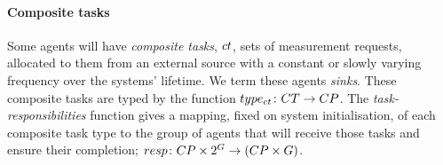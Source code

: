 \paragraph{Composite tasks}
\label{section:problem:composite_tasks}
\newcommand{\formalTaskResponsibilities}[2]{
	\functionFormal{resp}
	{\setCompositeTaskType{}{} \times \powerSetAgent{}{}{}{}}
	({\setCompositeTaskType{}{} \times \setAgent{}{}})
}
\newcommand{\functionTaskResponsibilities}[2]{
	\functionSignature{resp}
	{\varCompositeTaskType{}{}, \setAgent{}{}}
}
\newcommand{\functionTaskResponsibilitiesInstance}[2]{
	\functionSignature{resp}
    {\functionCompositeTaskType{}{}, \setAgent{}{}}
}

\newcommand{\formalCompositeTaskType}[2]{
	\functionFormal{type_{\varCompositeTask{}{}}}
	{\setCompositeTask{}{}}
	{\setCompositeTaskType{}{}}
}
\newcommand{\functionCompositeTaskType}[2]{
	\functionSignature{type_{\varCompositeTask{}{}}}
	{\varCompositeTask{#1}{#2}}
}

Some agents will have \textit{composite tasks}, $\varCompositeTask{}{}$, sets of measurement requests, allocated to them from an external source with a constant or slowly varying frequency over the systems' lifetime. We term these agents \textit{sinks}. These composite tasks are typed by the function $\formalCompositeTaskType{}{}$. The \textit{task-responsibilities} function gives a mapping, fixed on system initialisation, of each composite task type  to the group of agents that will receive those tasks and ensure their completion; $\formalTaskResponsibilities{}{}$.

\newcommand{\formalTaskDemandPoint}[2]{
	\functionFormal{demand}
	{\setAtomicTask  {}{}}{\tupleLocation{}{}}
}
\newcommand{\functionTaskDemandPoint}[2]{\functionSignature{demand}{\varAtomicTask{#1}{#2}}}

\newcommand{\functionRequiredResourcesSymbol}[2]{
	\functionSymbol{demandres}
}
\newcommand{\formalRequiredResources}[2]{
	\functionFormal{\functionRequiredResourcesSymbol{}{}}
	{\setAtomicTaskType{#1}{} \times \setResourceType{#2}{}}
	{\setRealNumbersNonNegative{}{}}
}
\newcommand{\functionRequiredResources}[2]{
	\functionSignature{\functionRequiredResourcesSymbol{}{}}{\varAtomicTaskType{#1}{}, \varResourceType{#2}{}}
}
\newcommand{\functionRequiredResourcesInstance}[2]{
	\functionSignature{\functionRequiredResourcesSymbol{}{}}
	{\functionAtomicTaskMapping{\varAtomicTask{#1}{}}{}, \varResourceType{#2}{}}
}

